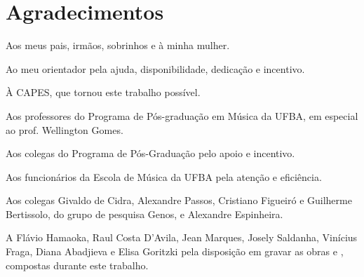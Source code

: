 \chapter*{Agradecimentos}
\label{cha:agradecimentos}

Aos meus pais, irmãos, sobrinhos e à minha mulher.

Ao meu orientador pela ajuda, disponibilidade, dedicação e incentivo.

À CAPES, que tornou este trabalho possível.

Aos professores do Programa de Pós-graduação em Música da UFBA, em
especial ao prof. Wellington Gomes.

Aos colegas do Programa de Pós-Graduação pelo apoio e incentivo.

Aos funcionários da Escola de Música da UFBA pela atenção e
eficiência.

Aos colegas Givaldo de Cidra, Alexandre Passos, Cristiano Figueiró e
Guilherme Bertissolo, do grupo de pesquisa Genos, e Alexandre
Espinheira.

A Flávio Hamaoka, Raul Costa D'Avila, Jean Marques, Josely Saldanha,
Vinícius Fraga, Diana Abadjieva e Elisa Goritzki pela disposição em
gravar as obras  e \obra{}, compostas
durante este trabalho.

